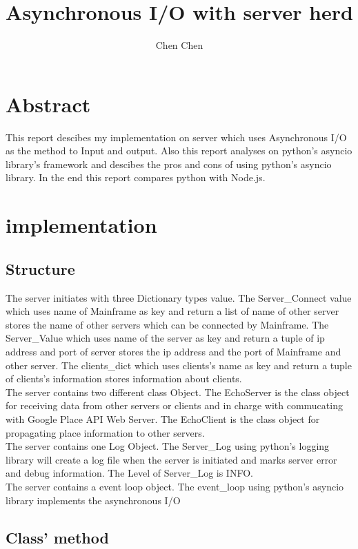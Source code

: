 \documentclass[10pt, a4paper]{IEEEtran}
\begin{document}
    
    \title{Asynchronous I/O with server herd}
    \author{Chen Chen}
    
    \maketitle
    \section{Abstract}
    This report descibes my implementation on server which uses Asynchronous I/O as the method to Input and output. Also this report analyses on python's asyncio library's framework and descibes the pros and cons of using python's asyncio library. In the end this report compares python with Node.js.
    \section{implementation}
    \subsection{Structure}
    The server initiates with three Dictionary types value. The Server\_Connect value which uses name of Mainframe as key and return a list of name of other server stores the name of other servers which can be connected by Mainframe. The Server\_Value which uses name of the server as key and return a tuple of ip address and port of server stores the ip address and the port of Mainframe and other server. The clients\_dict which uses clients's name as key and return a tuple of clients's information stores information about clients. \\
    The server contains two different class Object. The EchoServer is the class object for receiving data from other servers or clients and in charge with commucating with Google Place API Web Server. The EchoClient is the class object for propagating place information to other servers.\\
    The server contains one Log Object. The Server\_Log using python's logging library will create a log file when the server is initiated and marks server error and debug information. The Level of Server\_Log is INFO.\\
    The server contains a event loop object. The event\_loop using python's asyncio library implements the asynchronous I/O\\
    
    \subsection{Class' method}
    
\end{document}
